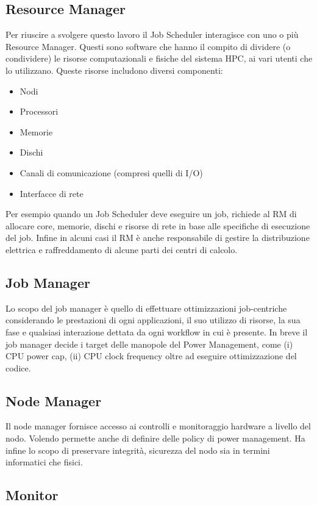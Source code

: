 \subsection{Resource Manager}
Per riuscire a svolgere questo lavoro il Job Scheduler interagisce con uno o più Resource Manager. Questi sono software che hanno il compito di dividere (o condividere) le risorse computazionali e fisiche del sistema HPC, ai vari utenti che lo utilizzano. Queste risorse includono diversi componenti:
\begin{itemize}
    \item Nodi
    \item Processori
    \item Memorie
    \item Dischi
    \item Canali di comunicazione (compresi quelli di I/O)
    \item Interfacce di rete 
\end{itemize}
Per esempio quando un Job Scheduler deve eseguire un job, richiede al RM di allocare core, memorie, dischi e risorse di rete in base alle specifiche di esecuzione del job.
Infine in alcuni casi il RM è anche responsabile di gestire la distribuzione elettrica e raffreddamento di alcune parti dei centri di calcolo\cite{ResourceManager}.

\subsection{Job Manager}
Lo scopo del job manager è quello di effettuare ottimizzazioni job-centriche considerando le prestazioni di ogni applicazioni, il suo utilizzo di risorse, la sua fase e qualsiasi interazione dettata da ogni workflow in cui è presente. In breve il job manager decide i target delle manopole del Power Management, come (i) CPU power cap, (ii) CPU clock frequency oltre ad eseguire ottimizzazione del codice.

\subsection{Node Manager}
Il node manager fornisce accesso ai controlli e monitoraggio hardware a livello del nodo. Volendo permette anche di definire delle policy di power management. Ha infine lo scopo di preservare integrità, sicurezza del nodo sia in termini informatici che fisici.

\subsection{Monitor}

